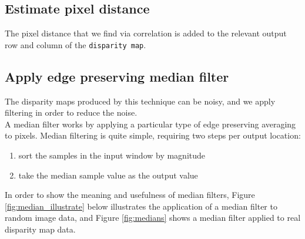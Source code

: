 \documentclass[11pt,fleqn]{article}
\begin{document}
\subsection{Estimate pixel distance}
The pixel distance that we find via correlation is added to the relevant output row and column of the \texttt{disparity map}.

\subsection{Apply edge preserving median filter}

The disparity maps produced by this technique can be noisy, and we apply filtering in order to reduce the noise.\\[5pt]
%
A median filter works by applying a particular type of edge preserving averaging to pixels. Median filtering is quite simple, requiring two steps per output location:

\newpage
\begin{enumerate}
\item sort the samples in the input window by magnitude
\item take the median sample value as the output value
\end{enumerate}
%
In order to show the meaning and usefulness of median filters, Figure \ref{fig:median_illustrate} below illustrates the application of a median filter to random image data, and Figure \ref{fig:medians} shows a median filter applied to real disparity map data.\\
\end{document}
